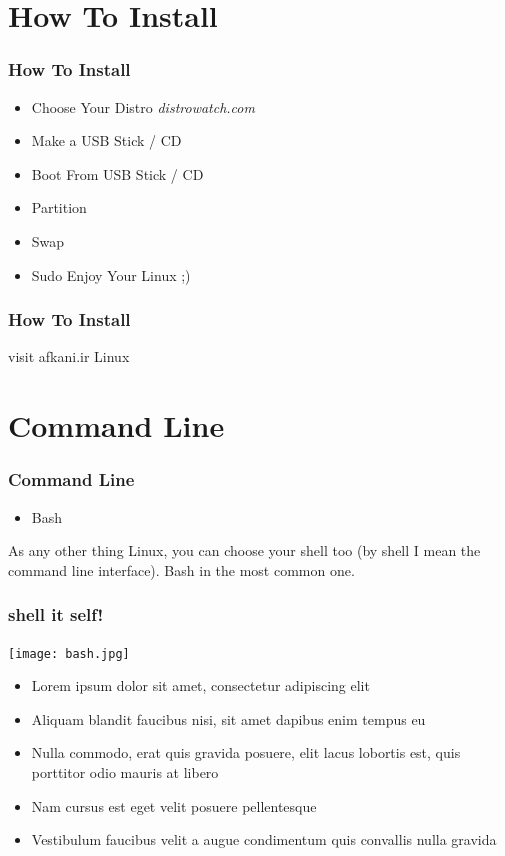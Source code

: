 \documentclass{beamer}
\begin{document}

\section{How To Install}
\begin{frame}
\frametitle{How To Install}
\begin{itemize}
\item Choose Your Distro \emph {distrowatch.com}
\item Make a USB Stick / CD
\item Boot From USB Stick / CD
\item Partition
\item Swap
\item Sudo Enjoy Your Linux ;)
\end{itemize}


\end{frame}

\begin{frame}
\frametitle{How To Install}
\Huge visit afkani.ir \triangleright Linux
\end{frame}

\section{Command Line}
\begin{frame}
\frametitle{Command Line}
\begin{itemize}
\item Bash
\end{itemize}
As any other thing Linux, you can choose your shell too (by shell I mean the command line interface). Bash in the most common one.


\end{frame}

\begin{frame}
\frametitle{shell it self!}
    \texttt{[image: bash.jpg]}
\begin{itemize}

\item Lorem ipsum dolor sit amet, consectetur adipiscing elit
\item Aliquam blandit faucibus nisi, sit amet dapibus enim tempus eu
\item Nulla commodo, erat quis gravida posuere, elit lacus lobortis est, quis porttitor odio mauris at libero
\item Nam cursus est eget velit posuere pellentesque
\item Vestibulum faucibus velit a augue condimentum quis convallis nulla gravida
\end{itemize}
\end{frame}
\end{document}
